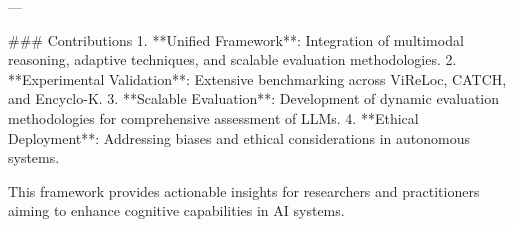 ---

### Contributions
1. **Unified Framework**: Integration of multimodal reasoning, adaptive techniques, and scalable evaluation methodologies.
2. **Experimental Validation**: Extensive benchmarking across ViReLoc, CATCH, and Encyclo-K.
3. **Scalable Evaluation**: Development of dynamic evaluation methodologies for comprehensive assessment of LLMs.
4. **Ethical Deployment**: Addressing biases and ethical considerations in autonomous systems.

This framework provides actionable insights for researchers and practitioners aiming to enhance cognitive capabilities in AI systems.